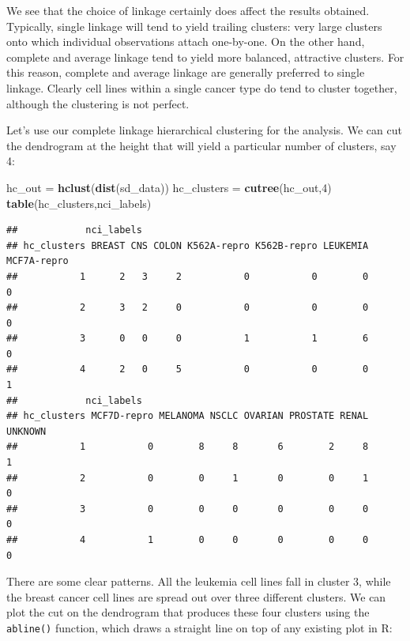 \documentclass[
  openany]{book}
\newenvironment{Shaded}{\begin{snugshade}}{\end{snugshade}}
\newcommand{\DecValTok}[1]{\textcolor[rgb]{0.00,0.00,0.81}{#1}}
\newcommand{\KeywordTok}[1]{\textcolor[rgb]{0.13,0.29,0.53}{\textbf{#1}}}
\newcommand{\NormalTok}[1]{#1}
\newcommand{\StringTok}[1]{\textcolor[rgb]{0.31,0.60,0.02}{#1}}
\begin{document}
We see that the choice of linkage
certainly does affect the results obtained. Typically, single linkage will tend
to yield trailing clusters: very large clusters onto which individual observations
attach one-by-one. On the other hand, complete and average linkage
tend to yield more balanced, attractive clusters. For this reason, complete
and average linkage are generally preferred to single linkage. Clearly cell
lines within a single cancer type do tend to cluster together, although the
clustering is not perfect.

Let's use our complete linkage hierarchical clustering
for the analysis. We can cut the dendrogram at the height that will yield a particular
number of clusters, say 4:

\begin{Shaded}
\begin{Highlighting}[]
\NormalTok{hc_out =}\StringTok{ }\KeywordTok{hclust}\NormalTok{(}\KeywordTok{dist}\NormalTok{(sd_data))}
\NormalTok{hc_clusters =}\StringTok{ }\KeywordTok{cutree}\NormalTok{(hc_out,}\DecValTok{4}\NormalTok{)}
\KeywordTok{table}\NormalTok{(hc_clusters,nci_labels)}
\end{Highlighting}
\end{Shaded}

\begin{verbatim}
##            nci_labels
## hc_clusters BREAST CNS COLON K562A-repro K562B-repro LEUKEMIA MCF7A-repro
##           1      2   3     2           0           0        0           0
##           2      3   2     0           0           0        0           0
##           3      0   0     0           1           1        6           0
##           4      2   0     5           0           0        0           1
##            nci_labels
## hc_clusters MCF7D-repro MELANOMA NSCLC OVARIAN PROSTATE RENAL UNKNOWN
##           1           0        8     8       6        2     8       1
##           2           0        0     1       0        0     1       0
##           3           0        0     0       0        0     0       0
##           4           1        0     0       0        0     0       0
\end{verbatim}

There are some clear patterns. All the leukemia cell lines fall in cluster 3,
while the breast cancer cell lines are spread out over three different clusters.
We can plot the cut on the dendrogram that produces these four clusters using the \texttt{abline()} function, which draws a straight line on top of any existing plot in R:
\end{document}
